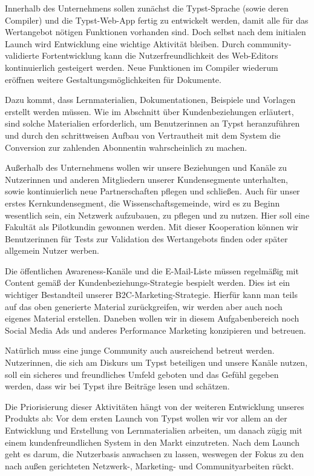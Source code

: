 \documentclass[11pt, a4paper]{article}
\newcommand{\gender}{\raisebox{-.25em}{*}}
\renewcommand{\glossary} {\marginsymbol{$\hookrightarrow$}}
\newcommand{\marginsymbol}[1] {\protect\marginsymbolhelper{#1}}
\newcommand{\marginsymbolhelper}[1] {\tabto*{-1cm}\makebox[0cm]{#1}\tabto*{\TabPrevPos}}
\begin{document}
Innerhalb des Unternehmens sollen zunächst die \glossary Typst-Sprache (sowie deren Compiler) und die Typst-Web-App fertig zu entwickelt werden, damit alle für das Wertangebot nötigen Funktionen vorhanden sind. Doch selbst nach dem initialen Launch wird Entwicklung eine wichtige Aktivität bleiben. Durch community-validierte Fortentwicklung kann die Nutzerfreundlichkeit des Web-Editors kontinuierlich gesteigert werden. Neue Funktionen im Compiler wiederum eröffnen weitere Gestaltungsmöglichkeiten für Dokumente.

Dazu kommt, dass Lernmaterialien, Dokumentationen, Beispiele und Vorlagen erstellt werden müssen. Wie im Abschnitt über Kundenbeziehungen erläutert, sind solche Materialien erforderlich, um Benutzer\gender{}innen an Typst heranzuführen und durch den schrittweisen Aufbau von Vertrautheit mit dem System die Conversion zur\gender{} zahlenden Abonnent\gender{}in wahrscheinlich zu machen.

Außerhalb des Unternehmens wollen wir unsere Beziehungen und Kanäle zu Nutzer\gender{}innen und anderen Mitgliedern unserer Kundensegmente unterhalten, sowie kontinuierlich neue Partnerschaften pflegen und schließen. Auch für unser erstes Kernkundensegment, die Wissenschaftsgemeinde, wird es zu Beginn wesentlich sein, ein Netzwerk aufzubauen, zu pflegen und zu nutzen. Hier soll eine Fakultät als Pilotkundin gewonnen werden. Mit dieser Kooperation können wir Benutzer\gender{}innen für Tests zur Validation des Wertangebots finden oder später allgemein Nutzer werben.

Die öffentlichen Awareness-Kanäle und die E-Mail-Liste müssen regelmäßig mit Content gemäß der Kundenbeziehungs-Strategie bespielt werden. Dies ist ein wichtiger Bestandteil unserer B2C-Marketing-Strategie. Hierfür kann man teils auf das oben generierte Material zurückgreifen, wir werden aber auch noch eigenes Material erstellen. Daneben wollen wir in diesem Aufgabenbereich noch Social Media Ads und anderes Performance Marketing konzipieren und betreuen.

Natürlich muss eine junge Community auch ausreichend betreut werden. Nutzer\gender{}innen, die sich am Diskurs um Typst beteiligen und unsere Kanäle nutzen, soll ein sicheres und freundliches Umfeld geboten und das Gefühl gegeben werden, dass wir bei Typst ihre Beiträge lesen und schätzen.

Die Priorisierung dieser Aktivitäten hängt von der weiteren Entwicklung unseres Produkts ab: Vor dem ersten Launch von Typst wollen wir vor allem an der Entwicklung und Erstellung von Lernmaterialien arbeiten, um danach zügig mit einem kundenfreundlichen System in den Markt einzutreten. Nach dem Launch geht es darum, die Nutzerbasis anwachsen zu lassen, weswegen der Fokus zu den nach außen gerichteten Netzwerk-, Marketing- und Communityarbeiten rückt.
\end{document}
